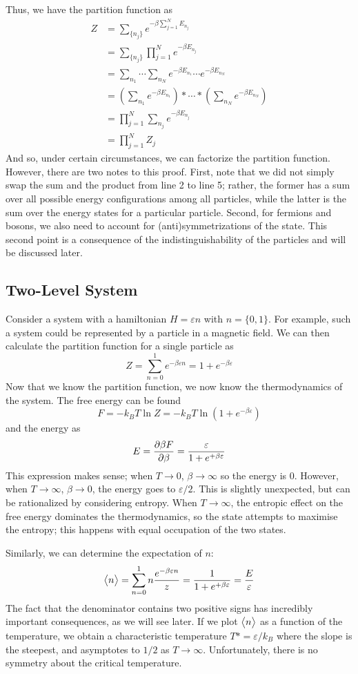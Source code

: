Thus, we have the partition function as
\begin{align*}
	Z &= \sum_{\{n_j\}} e^{-\beta \sum_{j=1}^N E_{n_j}}\\
	  &= \sum_{\{n_j\}} \prod_{j=1}^Ne^{-\beta E_{n_j}}\\
	  &= \sum_{n_1}\cdots\sum_{n_N}e^{-\beta E_{n_1}}\cdots e^{-\beta E_{n_N}}\\
	  &= \left(\sum_{n_1}e^{-\beta E_{n_1}}\right)*\cdots *\left(\sum_{n_N}e^{-\beta E_{n_N}}\right)\\
	  &=\prod_{j=1}^N\sum_{n_j} e^{-\beta E_{n_j}}\\
	  &=\prod_{j=1}^NZ_j
\end{align*}
And so, under certain circumstances, we can factorize the partition function. However, there are two notes to this proof. First, note that we did not simply swap the sum and the product from line 2 to line 5; rather, the former has a sum over all possible energy configurations among all particles, while the latter is the sum over the energy states for a particular particle. Second, for fermions and bosons, we also need to account for (anti)symmetrizations of the state. This second point is a consequence of the indistinguishability of the particles and will be discussed later. 

\subsection{Two-Level System}
Consider a  system with a hamiltonian \(H = \varepsilon n\) with \(n = \{0,1\}\). For example, such a system could be represented by a particle in a magnetic field. We can then calculate the partition function for a single particle as
\[Z = \sum_{n=0}^1 e^{-\beta\varepsilon n} = 1+e^{-\beta \varepsilon}\]
Now that we know the partition function, we now know the thermodynamics of the system. The free energy can be found
\[F = -k_BT\ln Z = -k_BT\ln ( 1+e^{-\beta\varepsilon})\]
and the energy as
\[E = \frac{\partial \beta F}{\partial \beta} = \frac{\varepsilon}{1+e^{+\beta \varepsilon}}\]
This expression makes sense; when \(T\to 0\), \(\beta\to\infty\) so the energy is 0. However, when \(T\to\infty\), \(\beta\to 0\), the energy goes to \(\varepsilon/2\). This is slightly unexpected, but can be rationalized by considering entropy. When \(T\to\infty\), the entropic effect on the free energy dominates the thermodynamics, so the state attempts to maximise the entropy; this happens with equal occupation of the two states.

Similarly, we can determine the expectation of \(n\):
\[\left\langle \begin{matrix}n\end{matrix} \right\rangle = \sum_{n=0}^1 n \frac{e^{-\beta \varepsilon n}}{z} = \frac{1}{1+e^{+\beta \varepsilon}} = \frac{E}{\varepsilon}\]
The fact that the denominator contains two positive signs has incredibly important consequences, as we will see later. If we plot \(\left\langle \begin{matrix}n\end{matrix} \right\rangle\) as a function of the temperature, we obtain a characteristic temperature \(T\ast = \varepsilon/k_B\) where the slope is the steepest, and asymptotes to \(1/2\) as \(T\to\infty\).
Unfortunately, there is no symmetry about the critical temperature.
\diagram\

